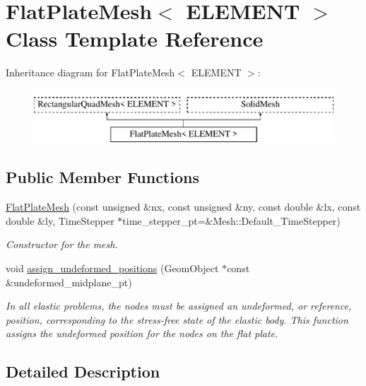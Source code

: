 \hypertarget{classFlatPlateMesh}{}\section{Flat\+Plate\+Mesh$<$ E\+L\+E\+M\+E\+NT $>$ Class Template Reference}
\label{classFlatPlateMesh}
Inheritance diagram for Flat\+Plate\+Mesh$<$ E\+L\+E\+M\+E\+NT $>$\+:\begin{figure}[H]
\begin{center}
\leavevmode
\includegraphics[height=2.000000cm]{classFlatPlateMesh}
\end{center}
\end{figure}
\subsection*{Public Member Functions}
\begin{DoxyCompactItemize}
\item 
\hyperlink{classFlatPlateMesh_a765cfa3692d1ab97790daf68d057a105}{Flat\+Plate\+Mesh} (const unsigned \&nx, const unsigned \&ny, const double \&lx, const double \&ly, Time\+Stepper $\ast$time\+\_\+stepper\+\_\+pt=\&Mesh\+::\+Default\+\_\+\+Time\+Stepper)
\begin{DoxyCompactList}\small\item\em Constructor for the mesh. \end{DoxyCompactList}\item 
void \hyperlink{classFlatPlateMesh_ad1c2d7972207aa87f17409d5d62e82fc}{assign\+\_\+undeformed\+\_\+positions} (Geom\+Object $\ast$const \&undeformed\+\_\+midplane\+\_\+pt)
\begin{DoxyCompactList}\small\item\em In all elastic problems, the nodes must be assigned an undeformed, or reference, position, corresponding to the stress-\/free state of the elastic body. This function assigns the undeformed position for the nodes on the flat plate. \end{DoxyCompactList}\end{DoxyCompactItemize}


\subsection{Detailed Description}
